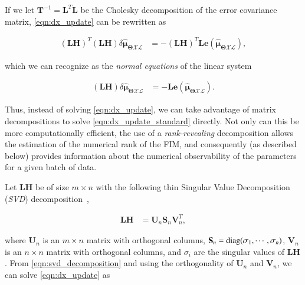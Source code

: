 If we let $\mathbf{T}^{-1}=\mathbf{L}^T\mathbf{L}$ be the Cholesky
decomposition of the error covariance matrix, \eqref{eqn:dx_update} can be
rewritten as

\begin{equation}\label{eqn:dx_update_normal}
  \begin{aligned}
  (\mathbf{L}\mathbf{H})^T(\mathbf{L}\mathbf{H})
    \delta\hat{\boldsymbol{\mu}}_{\boldsymbol{\Theta}\mathcal{X}\mathcal{L}} &=
    -(\mathbf{L}\mathbf{H})^T\mathbf{L}
    \mathbf{e}(\mathbf{\hat{\boldsymbol{\mu}}_{
    \boldsymbol{\Theta}\mathcal{X}\mathcal{L}}}),
  \end{aligned}
\end{equation}

\noindent which we can recognize as the \emph{normal equations} of the linear
system

\begin{equation}\label{eqn:dx_update_standard}
  \begin{aligned}
  (\mathbf{L}\mathbf{H})
    \delta\hat{\boldsymbol{\mu}}_{\boldsymbol{\Theta}\mathcal{X}\mathcal{L}} &=
    -\mathbf{L}\mathbf{e}(
    \mathbf{\hat{\boldsymbol{\mu}}_{
    \boldsymbol{\Theta}\mathcal{X}\mathcal{L}}}).
  \end{aligned}
\end{equation}

\noindent Thus, instead of solving \eqref{eqn:dx_update}, we can take
advantage of matrix decompositions to solve
\eqref{eqn:dx_update_standard} directly. Not only can this be more
computationally efficient, the use of a {\em rank-revealing}
decomposition allows the estimation of the numerical rank of the
FIM, and consequently (as described below) provides information about the
numerical observability of the parameters for a given batch of data.

Let $\mathbf{L}\mathbf{H}$ be of size $m\times n$ with the following thin
Singular Value Decomposition (\emph{SVD}) decomposition~\cite{golub96matrix},

\begin{equation}\label{eqn:svd_decomposition}
  \begin{aligned}
  \mathbf{L}\mathbf{H} &= \mathbf{U}_n\mathbf{S}_n\mathbf{V}_n^T,
  \end{aligned}
\end{equation}

\noindent where $\mathbf{U}_n$ is an $m\times n$ matrix with orthogonal columns,
$\mathbf{S}_n=\operatorname{diag}(\sigma_1, \cdots,\sigma_n)$, $\mathbf{V}_n$ is an
$n\times n$ matrix with orthogonal columns, and $\sigma_i$ are the
singular values of $\mathbf{L}\mathbf{H}$. From \eqref{eqn:svd_decomposition}
and using the orthogonality of $\mathbf{U}_n$ and $\mathbf{V}_n$, we can solve
\eqref{eqn:dx_update} as

